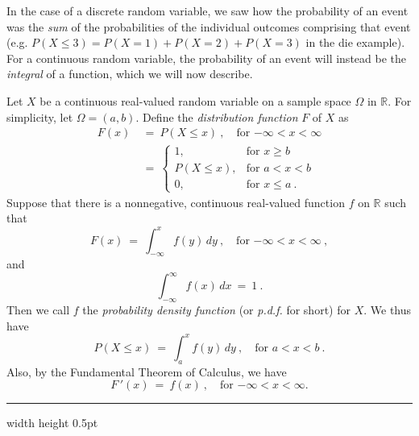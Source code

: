 In the case of a discrete random variable, we saw how the probability of an event was the \emph{sum} of the
probabilities of the individual outcomes comprising that event (e.g. $P(X \le 3) = P(X=1) + P(X=2) + P(X=3)$ in the die
example). For a continuous random variable, the probability of an event will instead be the \emph{integral} of a
function, which we will now describe.

Let $X$ be a continuous real-valued random variable on a sample space $\Omega$ in $\mathbb{R}$. For simplicity, let
$\Omega= (a,b)$. Define the \emph{distribution function} $F$ of $X$ as
\begin{align}\label{eqn:distribfcn}
 F(x) ~&=~ P(X \le x)~, \quad \text{for $-\infty < x < \infty$}\\
  &=~ \begin{cases}
   1, &\text{for $x \ge b$}\\
   P(X \le x), &\text{for $a < x < b$}\\
   0, &\text{for $x \le a~$.}
  \end{cases}
\end{align}
Suppose that there is a nonnegative, continuous real-valued function $f$ on $\mathbb{R}$ such that
\begin{equation}\label{eqn:pdf}
 F(x) ~=~ \int_{-\infty}^x f(y)\,dy~, \quad \text{for $-\infty < x < \infty$} ~,
\end{equation}
and
\begin{equation}\label{eqn:pdfint}
\int_{-\infty}^{\infty} f(x)\,dx ~=~ 1 ~.
\end{equation}
Then we call $f$ the \emph{probability density function} (or \emph{p.d.f.} for short) for $X$. We thus have
\begin{equation}\label{eqn:pdfprob}
 P(X \le x) ~=~ \int_{a}^x f(y)\,dy~, \quad \text{for $a < x < b$} ~.
\end{equation}
Also, by the Fundamental Theorem of Calculus, we have
\begin{equation}\label{eqn:pdfderiv}
 F\,'(x) ~=~ f(x)~, \quad \text{for $-\infty < x < \infty$.}
\end{equation}
\hrule width \textwidth height 0.5pt
